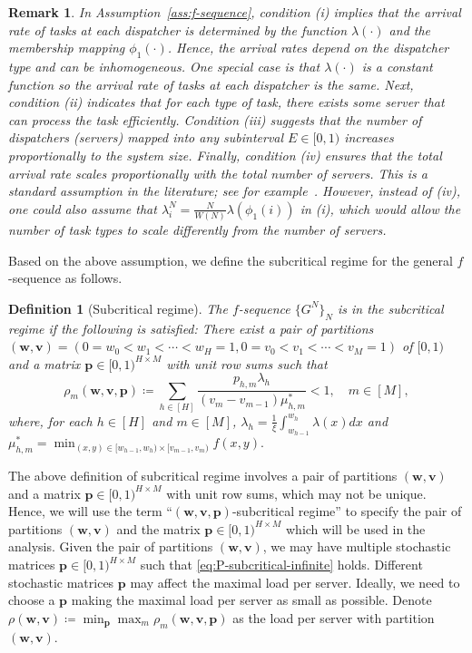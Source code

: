 \documentclass[11pt, reqno]{article}
\newtheorem{remark}[theorem]{Remark}
\newtheorem{defn}[theorem]{Definition}
\numberwithin{equation}{section}
\numberwithin{theorem}{section}
\begin{document}
\begin{remark}\normalfont
In Assumption~\ref{ass:f-sequence}, condition (i) implies that the arrival rate of tasks at each dispatcher is determined by the function $\lambda(\cdot)$ and the membership mapping $\phi_1(\cdot)$. Hence, the arrival rates depend on the dispatcher type and can be inhomogeneous. 
One special case is that $\lambda(\cdot)$ is a constant function so the arrival rate of tasks at each dispatcher is the same. 
Next, condition (ii) indicates that for each type of task, there exists some server that can process the task efficiently. 
Condition (iii) suggests that the number of dispatchers (servers) mapped into any subinterval $E\in[0,1)$ increases proportionally to the system size.
Finally, condition (iv) ensures that the total arrival rate scales proportionally with the total number of servers. 
This is a standard assumption in the literature; see for example~\cite{TX13, TX17}.
However, instead of (iv), one could also assume that $\lambda^N_i=\frac{N}{W(N)}\lambda(\phi_1(i))$ in (i), which would allow the number of task types to scale differently from the number of servers. 
\end{remark}
Based on the above assumption, we define the subcritical regime for the general $f$-sequence as follows.
\begin{defn}[Subcritical regime]\label{def: subcritical-general}
The $f$-sequence $\{G^N\}_N$ is in the subcritical regime if the following is satisfied:
There exist a pair of partitions $(\mathbf{w},\mathbf{v})=(0=w_0<w_1<\cdots<w_H=1,0=v_0<v_1<\cdots<v_M=1)$ of $[0,1)$ and a matrix $\mathbf{p}\in[0,1)^{H\times M}$ with unit row sums such that 
\begin{equation}\label{eq:P-subcritical-infinite}
    \rho_m(\mathbf{w},\mathbf{v},\mathbf{p})\coloneqq\sum_{h\in [H]}\frac{p_{h,m}\lambda_h}{(v_m-v_{m-1})\mu^*_{h,m}}<1, \quad m\in[M],
\end{equation}
where, for each $h\in[H]$ and $m\in[M]$, $\lambda_h=\frac{1}{\xi}\int_{w_{h-1}}^{w_h}\lambda(x)dx$ and
$\mu^*_{h,m}=\min_{(x,y)\in[w_{h-1},w_h)\times[v_{m-1},v_m)}f(x,y).$
\end{defn}
The above definition of subcritical regime involves a pair of partitions $(\mathbf{w},\mathbf{v})$ and a matrix $\mathbf{p}\in[0,1)^{H\times M}$ with unit row sums, which may not be unique. 
Hence, we will use the term ``$(\mathbf{w},\mathbf{v},\mathbf{p})$-subcritical regime'' to specify the pair of partitions $(\mathbf{w},\mathbf{v})$ and the  matrix $\mathbf{p}\in[0,1)^{H\times M}$ which will be used in the analysis. 
Given the pair of partitions $(\mathbf{w},\mathbf{v})$, we may have multiple stochastic matrices $\mathbf{p}\in [0,1)^{H\times M}$ such that \eqref{eq:P-subcritical-infinite} holds. Different stochastic matrices $\mathbf{p}$ may affect the maximal load per server. Ideally, we need to choose a $\mathbf{p}$ making the maximal load per server as small as possible. Denote $\rho(\mathbf{w},\mathbf{v})\coloneqq\min_{\mathbf{p}}\max_{m}\rho_m(\mathbf{w},\mathbf{v},\mathbf{p})$ as the load per server with partition $(\mathbf{w},\mathbf{v})$.
\end{document}
